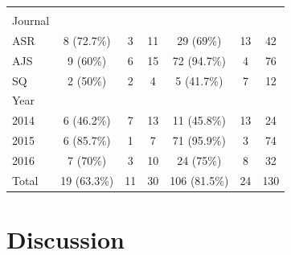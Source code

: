 \documentclass[
  12pt,
]{article}
\begin{document}
\begin{longtable}[t]{lcccccc}
\addlinespace[0.3em]
\multicolumn{7}{l}{\textbf{‘Hyp'}}\\
\hspace{1em}Journal &  &  &  &  &  & \\
\hspace{1em}\hspace{1em}ASR & 8 (72.7\%) & 3 & 11 & 29 (69\%) & 13 & 42\\
\hspace{1em}\hspace{1em}AJS & 9 (60\%) & 6 & 15 & 72 (94.7\%) & 4 & 76\\
\hspace{1em}\hspace{1em}SQ & 2 (50\%) & 2 & 4 & 5 (41.7\%) & 7 & 12\\
\hspace{1em}Year &  &  &  &  &  & \\
\hspace{1em}\hspace{1em}2014 & 6 (46.2\%) & 7 & 13 & 11 (45.8\%) & 13 & 24\\
\hspace{1em}\hspace{1em}2015 & 6 (85.7\%) & 1 & 7 & 71 (95.9\%) & 3 & 74\\
\hspace{1em}\hspace{1em}2016 & 7 (70\%) & 3 & 10 & 24 (75\%) & 8 & 32\\
\hspace{1em}Total & 19 (63.3\%) & 11 & 30 & 106 (81.5\%) & 24 & 130\\*
\end{longtable}
\vspace{2cm}

\hypertarget{discussion}{%
\section{Discussion}\label{discussion}}
\end{document}
